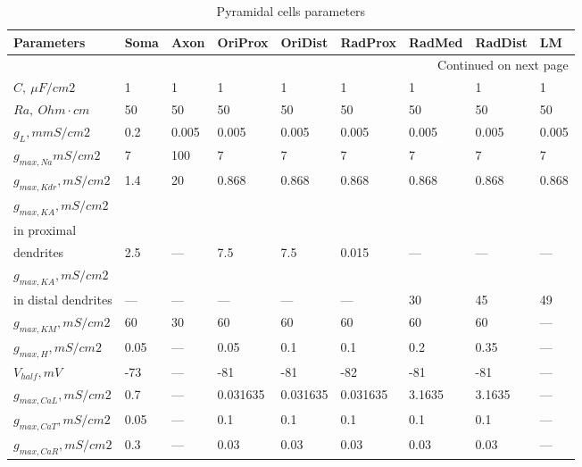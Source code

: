 {\footnotesize
\begin{longtable}{lllllllll}

\caption{Pyramidal cells parameters}
\label{table:ca1_pyramidal_cell_parameters} \\
\toprule
Parameters &     Soma &   Axon &   OriProx &   OriDist &   RadProx &  RadMed & RadDist &     LM \\
\midrule
\endhead
\midrule
\multicolumn{9}{r}{{Continued on next page}} \\
\midrule
\endfoot

\bottomrule
\endlastfoot

$C, \ \mu F/cm2$ &        1 &      1 &         1 &         1 &         1 &       1 &       1 &      1 \\
$Ra, \ Ohm \cdot cm$ &       50 &     50 &        50 &        50 &        50 &      50 &      50 &     50 \\
$g_L,mmS/cm2$ &      0.2 &  0.005 &     0.005 &     0.005 &     0.005 &   0.005 &   0.005 &  0.005 \\
$g_{max, Na} mS/cm2$ &        7 &    100 &         7 &         7 &         7 &       7 &       7 &      7 \\
$g_{max, Kdr}, mS/cm2$ &      1.4 &     20 &     0.868 &     0.868 &     0.868 &   0.868 &   0.868 &  0.868 \\
$ g_{max, KA}, mS/cm2$ \\ in proximal \\ dendrites&      2.5 &    --- &       7.5 &       7.5 &     0.015 &     --- &     --- &    --- \\
$g_{max, KA}, mS/cm2$ \\ in distal dendrites &      --- &    --- &       --- &       --- &       --- &      30 &      45 &     49 \\
$g_{max, KM}, mS/cm2 $ &       60 &     30 &        60 &        60 &        60 &      60 &      60 &    --- \\
$ g_{max, H}, mS/cm2 $ &     0.05 &    --- &      0.05 &       0.1 &       0.1 &     0.2 &    0.35 &    --- \\
$ V_{half}, mV$ &      -73 &    --- &       -81 &       -81 &       -82 &     -81 &     -81 &    --- \\
$g_{max, CaL}, mS/cm2 $ &      0.7 &    --- &  0.031635 &  0.031635 &  0.031635 &  3.1635 &  3.1635 &    --- \\
$g_{max, CaT}, mS/cm2 $ &     0.05 &    --- &       0.1 &       0.1 &       0.1 &     0.1 &     0.1 &    --- \\
$g_{max, CaR}, mS/cm2 $ &      0.3 &    --- &      0.03 &      0.03 &      0.03 &    0.03 &    0.03 &    --- \\

\end{longtable}}
